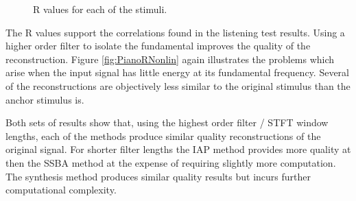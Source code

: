 \begin{figure}[h!]
		\quad
		\caption{R values for each of the stimuli.}
		\label{fig:SMCRNonlin}
	\end{figure}

	The R values support the correlations found in the listening test results. Using a higher order filter
	to isolate the fundamental improves the quality of the reconstruction. Figure \ref{fig:PianoRNonlin} again
	illustrates the problems which arise when the input signal has little energy at its fundamental frequency. Several
	of the reconstructions are objectively less similar to the original stimulus than the anchor stimulus is.

	Both sets of results show that, using the highest order filter / STFT window lengths, each of the methods produce
	similar quality reconstructions of the original signal. For shorter filter lengths the IAP method provides more
	quality at then the SSBA method at the expense of requiring slightly more computation. The synthesis method produces
	similar quality results but incurs further computational complexity. 

